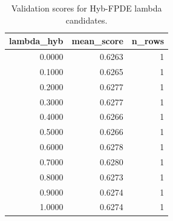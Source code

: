 \begin{table}[t]
\caption{Validation scores for Hyb-FPDE lambda candidates.}
\label{tab:lambda_distribution_computed}
\centering
\begin{tabular}{rrr}
\toprule
lambda\_hyb & mean\_score & n\_rows \\
\midrule
0.0000 & 0.6263 & 1 \\
0.1000 & 0.6265 & 1 \\
0.2000 & 0.6277 & 1 \\
0.3000 & 0.6277 & 1 \\
0.4000 & 0.6266 & 1 \\
0.5000 & 0.6266 & 1 \\
0.6000 & 0.6278 & 1 \\
0.7000 & 0.6280 & 1 \\
0.8000 & 0.6273 & 1 \\
0.9000 & 0.6274 & 1 \\
1.0000 & 0.6274 & 1 \\
\bottomrule
\end{tabular}

\end{table}
